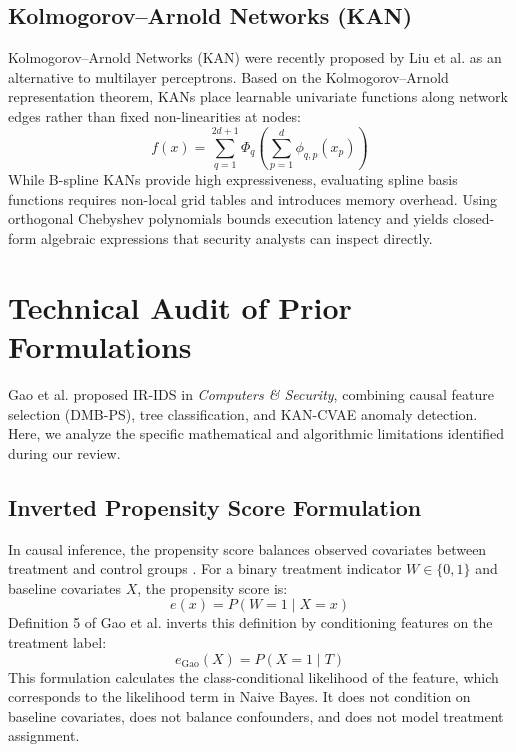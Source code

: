 \documentclass[10pt,journal,compsoc]{IEEEtran}
\begin{document}
\subsection{Kolmogorov--Arnold Networks (KAN)}
Kolmogorov--Arnold Networks (KAN) were recently proposed by Liu et al. \cite{liu2024kan} as an alternative to multilayer perceptrons. Based on the Kolmogorov--Arnold representation theorem, KANs place learnable univariate functions along network edges rather than fixed non-linearities at nodes:
\begin{equation}
f(x) = \sum_{q=1}^{2d+1} \Phi_q \left( \sum_{p=1}^d \phi_{q,p}(x_p) \right)
\end{equation}
While B-spline KANs provide high expressiveness, evaluating spline basis functions requires non-local grid tables and introduces memory overhead. Using orthogonal Chebyshev polynomials bounds execution latency and yields closed-form algebraic expressions that security analysts can inspect directly.

\section{Technical Audit of Prior Formulations}
Gao et al. \cite{gao2025} proposed IR-IDS in \textit{Computers \& Security}, combining causal feature selection (DMB-PS), tree classification, and KAN-CVAE anomaly detection. Here, we analyze the specific mathematical and algorithmic limitations identified during our review.

\subsection{Inverted Propensity Score Formulation}
In causal inference, the propensity score balances observed covariates between treatment and control groups \cite{rosenbaum1983}. For a binary treatment indicator $W \in \{0, 1\}$ and baseline covariates $X$, the propensity score is:
\begin{equation}
e(x) = P(W = 1 \mid X = x)
\end{equation}
Definition 5 of Gao et al. inverts this definition by conditioning features on the treatment label:
\begin{equation}
e_{\text{Gao}}(X) = P(X = 1 \mid T)
\end{equation}
This formulation calculates the class-conditional likelihood of the feature, which corresponds to the likelihood term in Naive Bayes. It does not condition on baseline covariates, does not balance confounders, and does not model treatment assignment.
\end{document}
